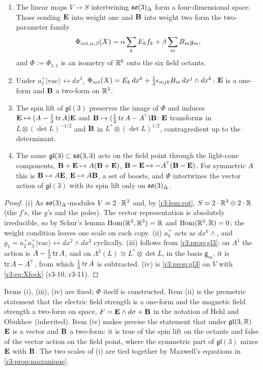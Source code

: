 \begin{theorem}
\label{r3:thm:phi}
\begin{enumerate}[label=(\roman*),leftmargin=2.2em]
\item The linear maps $V\to S$ intertwining $\mathfrak{so}(3)_\Delta$ form a four-dimensional space. Those sending $\mathbf E$ into weight one and $\mathbf B$ into
weight two form the two-parameter family
\[
\Phi_{{\rm oct},\alpha,\beta}(X)=\alpha\sum_kE_kf_k+\beta\sum_mB_mg_m ,
\]
and $\Phi:=\Phi_{1,1}$ is an isometry of $\mathbb{R}^6$ onto the six field octants.
\item Under $a^+_I|\mathrm{vac}\rangle\leftrightarrow dx^I$, $\Phi_{\rm oct}(X)=E_k\,dx^k+\tfrac12\epsilon_{mjk}B_m\,dx^j\wedge dx^k$: $\mathbf E$ is a one-form and $\mathbf B$ a two-form
on $\mathbb{R}^3$.
\item The spin lift of $\mathfrak{gl}(3)$ preserves the image of $\Phi$ and induces $\mathbf E\mapsto(A-\tfrac12\operatorname{tr} A)\mathbf E$ and $\mathbf B\mapsto(\tfrac12\operatorname{tr} A-A^{\!\top})\mathbf B$: $\mathbf E$
transforms in $L\otimes(\det L)^{-1/2}$ and $\mathbf B$ in $L^*\otimes(\det L)^{1/2}$, contragredient up to the determinant.
\item The same $\mathfrak{gl}(3)\subset\mathfrak{so}(3,3)$ acts on the field point through the light-cone components, $\mathbf B+\mathbf E\mapsto A(\mathbf B+\mathbf E)$,
$\mathbf B-\mathbf E\mapsto-A^{\!\top}(\mathbf B-\mathbf E)$. For symmetric $A$ this is $\mathbf B\mapsto A\mathbf E$, $\mathbf E\mapsto A\mathbf B$, a set of boosts, and $\Phi$ intertwines the
vector action of $\mathfrak{gl}(3)$ with its spin lift only on $\mathfrak{so}(3)_\Delta$.
\end{enumerate}
\end{theorem}

\begin{proof}
(i) As $\mathfrak{so}(3)_\Delta$-modules $V=2\cdot\mathbb{R}^3$ and, by \cref{r3:lem:rot}, $S=2\cdot\mathbb{R}^3\oplus2\cdot\mathbb{R}$ (the $f$'s, the $g$'s and the poles). The
vector representation is absolutely irreducible, so by Schur's lemma \cite{GoodmanWallach} $\operatorname{Hom}(\mathbb{R}^3,\mathbb{R}^3)=\mathbb{R}$ and $\operatorname{Hom}(\mathbb{R}^3,\mathbb{R})=0$; the
weight condition leaves one scale on each copy. (ii) $a^+_k$ acts as $dx^k\wedge$, and $g_1=a^+_2a^+_3|\mathrm{vac}\rangle\leftrightarrow dx^2\wedge dx^3$
cyclically. (iii) follows from \cref{r3:prop:gl3}: on $\Lambda^1$ the action is $A-\tfrac12\operatorname{tr} A$, and on $\Lambda^2(L)\cong L^*\otimes\det L$, in the
basis $\mathsf g_m$, it is $\operatorname{tr} A-A^{\!\top}$, from which $\tfrac12\operatorname{tr} A$ is subtracted. (iv) is \cref{r3:prop:gl3} on $V$ with \cref{r3:eq:Xfock}
(r3-10, r3-11).
\end{proof}

Items (i), (iii), (iv) are fixed; $\Phi$ itself is constructed. Item (ii) is the premetric statement that the electric field strength is a
one-form and the magnetic field strength a two-form on space, $F=\mathbf E\wedge d\sigma+\mathbf B$ in the notation of Hehl and Obukhov \cite{HehlObukhov03}
(inherited). Item (iv) makes precise the statement that under $\mathfrak{gl}(3,\mathbb{R})$ $\mathbf E$ is a vector and $\mathbf B$ a two-form: it is
true of the spin lift on the octants and false of the vector action on the field point, where the symmetric part of $\mathfrak{gl}(3)$
mixes $\mathbf E$ with $\mathbf B$. The two scales of (i) are tied together by Maxwell's equations in \cref{r3:prop:maxunique}.

